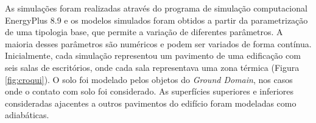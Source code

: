 \documentclass[brazil,hardcopy,openany]{ufscthesis} %
\begin{document}
%		

As simulações foram realizadas através do programa de simulação computacional EnergyPlus 8.9 \cite{EnergyPlus2018} e os modelos simulados foram obtidos a partir da parametrização de uma tipologia base, que permite a variação de diferentes parâmetros.  %
A maioria desses parâmetros são numéricos e podem ser variados de forma contínua. 
Inicialmente, cada simulação representou um pavimento de uma edificação com seis salas de escritórios, onde cada sala representava uma zona térmica (Figura \ref{fig:croqui}).
O solo foi modelado pelos objetos do \textit{Ground Domain}, nos casos onde o contato com solo foi considerado. As superfícies superiores e inferiores consideradas ajacentes a outros pavimentos do edifício foram modeladas como adiabáticas.
\end{document}
